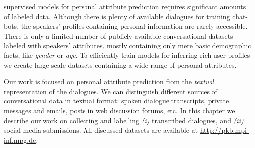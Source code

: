  supervised models for personal attribute prediction requires significant amounts of labeled data. Although there is plenty of available dialogues for training chat-bots, the speakers' profiles containing personal information are rarely accessible. There is only a limited number of publicly available conversational datasets labeled with speakers' attributes, mostly containing only mere basic demographic facts, like \textit{gender} or \textit{age}. To efficiently train models for inferring rich user profiles we create large scale datasets containing a wide range of personal attributes.

Our work is focused on personal attribute prediction from the \textit{textual} representation of the dialogues. We can distinguish different sources of conversational data in textual format: spoken dialogue transcripts, private messages and emails, posts in web discussion forums, etc. In this chapter we describe our work on collecting and labelling \textit{(i)} transcribed dialogues, and \textit{(ii)} social media submissions. All discussed datasets are available at \href{http://pkb.mpi-inf.mpg.de}{http://pkb.mpi-inf.mpg.de}.


